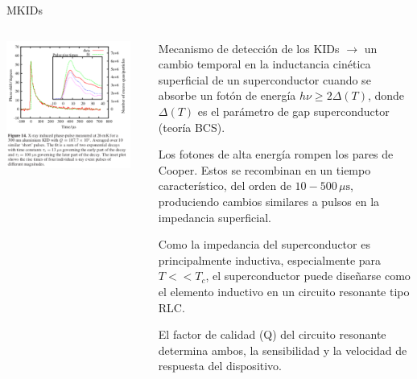 \documentclass[ignorenonframetext,12pt]{beamer}
\begin{document}
\begin{frame}{MKIDs}
				\begin{columns}
								\begin{column}{0.49\textwidth}
												\centering
												\includegraphics[width=0.92\textwidth]{pulso_respuesta_mkid2}
								\end{column}
								\begin{column}{0.59\textwidth}
												\footnotesize{Mecanismo de detección de los KIDs $\to$ un
												cambio temporal en la inductancia cinética superficial
												de un superconductor cuando se absorbe un fotón de
												energía $h\nu \geq 2 \Delta(T)$, donde $\Delta(T)$ es el
												parámetro de gap superconductor (teoría BCS).
												\pause

												Los fotones de alta energía rompen los pares de Cooper.
												Estos se recombinan en un tiempo característico, del
												orden de $10-500\,\mu\text{s}$,	{\color{red}produciendo
												cambios similares a	pulsos en la impedancia	
												superficial.}
												\pause

												Como la impedancia del superconductor es principalmente
												inductiva, especialmente para $T << T_c$,
												el superconductor puede diseñarse como el elemento
												inductivo en un circuito resonante tipo RLC.
												\pause

												{\color{blue}El factor de calidad (Q) del circuito
												resonante determina ambos, la \alert{sensibilidad} y la
												\alert{velocidad} de respuesta del dispositivo}.}
								\end{column}
				\end{columns}
\end{frame}
\end{document}
